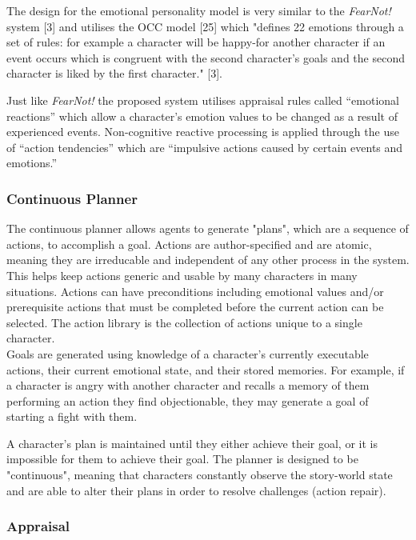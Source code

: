 \documentclass{sig-alternate-05-2015}
\begin{document}
The design for the emotional personality model is very similar to the \textit{FearNot!} system [3] and utilises the OCC model [25] which "defines 22 emotions through a set of rules: for example a character will be happy-for another  character if an event occurs which is congruent with the second character’s goals and the second character is liked by the first character." [3].

Just like \textit{FearNot!} the proposed system utilises appraisal rules called ``emotional reactions'' which allow a character's emotion values to be changed as a result of experienced events. Non-cognitive reactive processing is applied through the use of ``action tendencies'' which are ``impulsive actions caused by certain events and emotions.''\\

\subsubsection{Continuous Planner}
\noindent The continuous planner allows agents to generate "plans", which are a sequence of actions, to accomplish a goal. Actions are author-specified and are atomic, meaning they are irreducable and independent of any other process in the system. This helps keep actions generic and usable by many characters in many situations. Actions can have preconditions including emotional values and/or prerequisite actions that must be completed before the current action can be selected. The action library is the collection of actions unique to a single character.\\

Goals are generated using knowledge of a character's currently executable actions, their current emotional state, and their stored memories. For example, if a character is angry with another character and recalls a memory of them performing an action they find objectionable, they may generate a goal of starting a fight with them.

A character's plan is maintained until they either achieve their goal, or it is impossible for them to achieve their goal. The planner is designed to be "continuous", meaning that characters constantly observe the story-world state and are able to alter their plans in order to resolve challenges (action repair).

\subsubsection{Appraisal}
\end{document}
